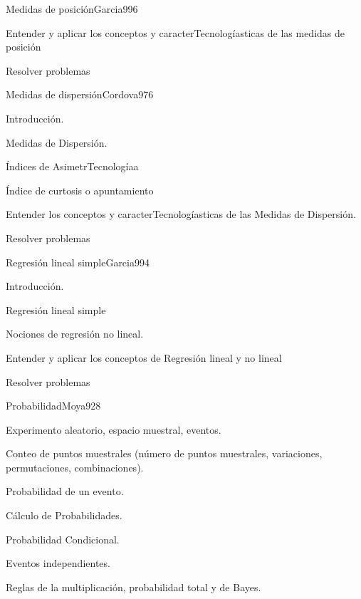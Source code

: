 \begin{syllabus}
\begin{unit}{Medidas de posición}{Garcia99}{6}
   \begin{unitgoals}
         \item  Entender y aplicar los conceptos y caracterTecnologíasticas de las medidas de posición
         \item  Resolver problemas
   \end{unitgoals}
\end{unit}

\begin{unit}{Medidas de dispersión}{Cordova97}{6}
   \begin{topics}
         \item  Introducción.
	 \item  Medidas de Dispersión.
         \item  Índices de AsimetrTecnologíaa
	 \item  Índice de curtosis o apuntamiento
   \end{topics}

   \begin{unitgoals}
         \item  Entender los conceptos y caracterTecnologíasticas de las Medidas de Dispersión.
         \item  Resolver problemas
   \end{unitgoals}
\end{unit}

\begin{unit}{Regresión lineal simple}{Garcia99}{4}
   \begin{topics}
         \item  Introducción.
	 \item  Regresión lineal simple
         \item  Nociones de regresión no lineal.
   \end{topics}

   \begin{unitgoals}
         \item  Entender y aplicar los conceptos de Regresión lineal y no lineal
         \item  Resolver problemas
   \end{unitgoals}
\end{unit}

\begin{unit}{Probabilidad}{Moya92}{8}
   \begin{topics}
         \item  Experimento aleatorio, espacio muestral, eventos.
	 \item  Conteo de puntos muestrales (número de puntos muestrales, variaciones, permutaciones, combinaciones).
         \item  Probabilidad de un evento.
	 \item  Cálculo de Probabilidades.
	\item Probabilidad Condicional.
	\item Eventos independientes.
	\item Reglas de la multiplicación, probabilidad total y de Bayes.
   \end{topics}


\end{unit}
\end{syllabus}
